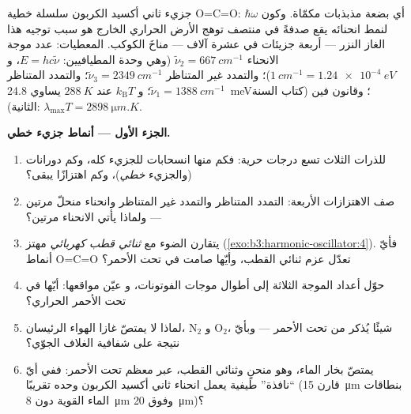 \begin{problem}\label{pb:b3:harmonic-oscillator:1}
جزيء ثاني أكسيد الكربون سلسلة خطية O=C=O: أي بضعة
مذبذبات مكمّاة. وكون $\hbar\omega$ لنمط انحنائه يقع صدفةً في
منتصف توهج الأرض الحراري الخارج هو سبب توجيه هذا الغاز النزر
--- أربعة جزيئات في عشرة آلاف --- مناخَ الكوكب. المعطيات:
عدد موجة الانحناء $\tilde\nu_2 = \qty{667}{cm^{-1}}$
(وهي وحدة المطيافيين: $E = hc\tilde\nu$، و $\qty{1}{cm^{-1}} =
\qty{1.24e-4}{eV}$)؛ والتمدد غير المتناظر $\tilde\nu_3 =
\qty{2349}{cm^{-1}}$؛ والتمدد المتناظر $\tilde\nu_1 =
\qty{1388}{cm^{-1}}$؛ و $k_{\text{B}}T$ عند $\qty{288}{K}$ يساوي
\qty{24.8}{meV}؛ وقانون فين (كتاب السنة الثانية): $\lambda_{\max}T =
\qty{2898}{\micro m.K}$.

\medskip\noindent\textbf{الجزء الأول --- أنماط جزيء خطي.}
\begin{enumerate}
  \item للذرات الثلاث تسع درجات حرية: فكم منها انسحابات
        للجزيء كله، وكم دورانات (والجزيء \emph{خطي})،
        وكم اهتزازًا يبقى؟
  \item صف الاهتزازات الأربعة: التمدد المتناظر والتمدد
        غير المتناظر وانحناء منحلّ مرتين --- ولماذا يأتي الانحناء
        مرتين؟
  \item يتقارن الضوء مع \emph{ثنائي قطب كهربائي} مهتز
        (\cref{exo:b3:harmonic-oscillator:4}). فأيّ أنماط
        O=C=O تعدّل عزم ثنائي القطب، وأيّها
        صامت في تحت الأحمر؟
  \item حوّل أعداد الموجة الثلاثة إلى أطوال موجات الفوتونات، و
        عيّن مواقعها: أيّها في تحت الأحمر الحراري؟
  \item لماذا لا يمتصّ غازا الهواء الرئيسان، N$_2$ و O$_2$،
        شيئًا يُذكر من تحت الأحمر --- وبأيّ نتيجة على
        شفافية الغلاف الجوّي؟
  \item يمتصّ بخار الماء، وهو منحنٍ وثنائي القطب، عبر معظم
        تحت الأحمر: ففي أيّ ``نافذة'' طيفية يعمل انحناء ثاني أكسيد
        الكربون وحده تقريبًا (قارن \qty{15}{\micro m} بنطاقات
        الماء القوية دون \qty{8}{\micro m} وفوق
        \qty{20}{\micro m})؟
\end{enumerate}


\end{problem}
